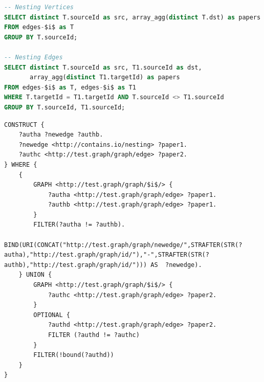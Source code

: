 \begin{lstfloat}
\begin{lstlisting}[caption={Graph Nesting in PostgreSQL. Two distinct tables are created for both vertices and edges. The nesting is represented by nesting the elements' id within an array (\texttt{array\_agg}). Please note that such sybtax is not SQL-3 standard.},language=SQL,frameround=fttt,frame=trBL,mathescape=true,label=SQLNesting]
-- Nesting Vertices
SELECT distinct T.sourceId as src, array_agg(distinct T.dst) as papers 
FROM edges-$i$ as T 
GROUP BY T.sourceId;

-- Nesting Edges
SELECT distinct T.sourceId as src, T1.sourceId as dst, 
       array_agg(distinct T1.targetId) as papers
FROM edges-$i$ as T, edges-$i$ as T1 
WHERE T.targetId = T1.targetId AND T.sourceId <> T1.sourceId 
GROUP BY T.sourceId, T1.sourceId;
\end{lstlisting}

\begin{lstlisting}[caption={Graph Nesting in SPARQL. Given that the RDF List solution is inefficient and that named graphs cannot be used either in the RDF models as vertices or edges, we use other properties to associate to either vertices and edges the nesting content.},language=SPARQL,frameround=fttt,frame=trBL,tabsize=2,mathescape=true,label=SPARQLNesting]
CONSTRUCT {
	?autha ?newedge ?authb.
	?newedge <http://contains.io/nesting> ?paper1.
	?authc <http://test.graph/graph/edge> ?paper2.
} WHERE {
	{
		GRAPH <http://test.graph/graph/$i$/> {
			?autha <http://test.graph/graph/edge> ?paper1.
			?authb <http://test.graph/graph/edge> ?paper1.
		}
		FILTER(?autha != ?authb).
		BIND(URI(CONCAT("http://test.graph/graph/newedge/",STRAFTER(STR(?autha),"http://test.graph/graph/id/"),"-",STRAFTER(STR(?authb),"http://test.graph/graph/id/"))) AS  ?newedge).
	} UNION {
		GRAPH <http://test.graph/graph/$i$/> {
			?authc <http://test.graph/graph/edge> ?paper2.
		}
		OPTIONAL {
			?authd <http://test.graph/graph/edge> ?paper2.
			FILTER (?authd != ?authc)
		}
		FILTER(!bound(?authd))
	}
}
\end{lstlisting}
\end{lstfloat}


